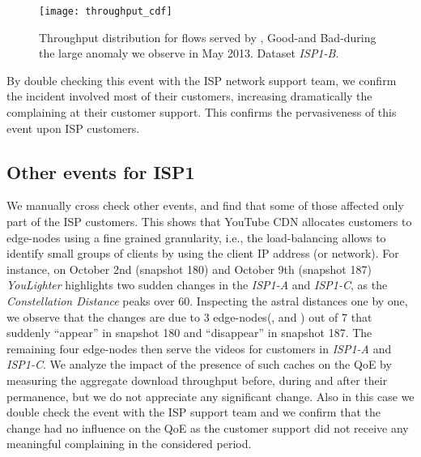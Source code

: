\documentclass{acm_proc_article-sp}
\newcommand{\tool}{\textit{YouLighter}\xspace}
\newcommand{\distance}{\textit{Constellation Distance}\xspace}
\newcommand{\nodes}{{edge-nodes}\xspace}
\newcommand{\TApub}{\textit{ISP1-A}\xspace}
\newcommand{\TApri}{\textit{ISP1-B}\xspace}
\newcommand{\TBpub}{\textit{ISP1-C}\xspace}
\begin{document}
\begin{figure}[t!]
\centering
    \texttt{[image: throughput\_cdf]}
    \caption{Throughput distribution for flows served by \MIL, Good-\FRA and Bad-\FRA during the large anomaly we observe in May 2013. Dataset \TApri.}
    \label{fig:thru}
\end{figure}

\begin{table}[t!]
\centering
{}
  \caption{Fractions of video and audio DASH formats served by Good-\FRA and Bad-\FRA. Dataset \TApri.}
  \label{tab:formats}
\end{table}

By double checking this event with the ISP network support team, we confirm the incident involved most of their customers, increasing dramatically the complaining at their customer support.
This confirms the pervasiveness of this event upon ISP customers.



\subsection{Other events for ISP1}
We manually cross check other events, and find that some of those affected only part of the ISP customers.
This shows that YouTube CDN allocates customers to \nodes using a fine grained granularity, i.e., the load-balancing allows to identify small groups of clients by using the client IP address (or network).
For instance, on October 2nd (snapshot 180) and October 9th (snapshot 187) \tool highlights two sudden changes in the \TApub and \TBpub, as the \distance peaks over $60$.
Inspecting the astral distances one by one, we observe that the changes are due to 3 \nodes(\SWI, \SWII and \LND) out of 7 that suddenly ``appear'' in snapshot 180 and ``disappear'' in snapshot 187. The remaining four \nodes then serve the videos for customers in \TApub and \TBpub. We analyze the impact of the presence of such caches on the QoE by measuring the aggregate download throughput before, during and after their permanence, but we do not appreciate any significant change. Also in this case we double check the event with the ISP support team and we confirm that the change had no influence on the QoE as the customer support did not receive any meaningful complaining in the considered period.
\end{document}
